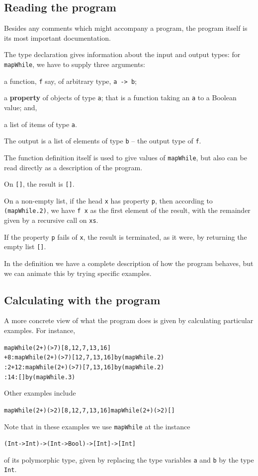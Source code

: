 \subsection*{Reading the program}
Besides any comments which might accompany a program, the program itself is
its most important documentation. 

The type declaration
gives information about
the input and output types: for \texttt{mapWhile}, we have to supply three
arguments:
\begin{titemize}
\item a function, \texttt{f} say, of arbitrary type, \texttt{a -> b};
\item a \textbf{property\/} of objects of type \texttt{a}; that is a function
taking an \texttt{a} to a Boolean value; and,
\item a list of items of type \texttt{a}.
\end{titemize}
The output is a list of elements of type \texttt{b} --
the output type of \texttt{f}.

The function definition itself is used to give values of \texttt{mapWhile}, but
also can be read directly as a description of the program.
\begin{titemize}
\item On \texttt{[]}, the result is \texttt{[]}.
\item On a non-empty list, if the head \texttt{x} has property \texttt{p}, then
according to \texttt{(mapWhile.2)}, we have \texttt{f x} as the first element of the
result, with the remainder given by a recursive call on \texttt{xs}.
\item If the property \texttt{p} fails of \texttt{x}, the result is terminated, as
it were, by returning the empty list \texttt{[]}.
\end{titemize}
In the definition we have a complete description of how the program behaves,
but we can animate this by trying specific examples.


\subsection*{Calculating with the program}

A more concrete view of what the program does is given by calculating
particular examples. For instance,
\begin{alltt}
mapWhile (2+) (>7) [8,12,7,13,16]
+8 : mapWhile (2+) (>7) [12,7,13,16] \hfill {\rm by} (mapWhile.2)
 : 2+12 : mapWhile (2+) (>7) [7,13,16] \hfill {\rm by} (mapWhile.2)
 : 14 : [] \hfill {\rm by} (mapWhile.3)
\step [10,14]
\end{alltt}
Other examples include
\begin{alltt}
mapWhile (2+) (>2) [8,12,7,13,16] \step [10,14,9,15,18]
mapWhile (2+) (>2) []             \step []
\end{alltt}
Note that in these examples we use \texttt{mapWhile} at the instance
\begin{alltt}
(Int -> Int) -> (Int -> Bool) -> [Int] -> [Int]
\end{alltt} 
of its polymorphic type,
given by replacing the type variables \texttt{a} and \texttt{b} by the type 
\texttt{Int}.

